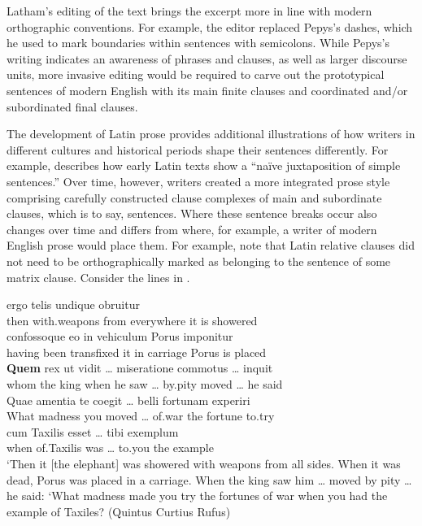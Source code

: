 \noindent Latham's \citep[34]{Pepys1978} editing of the text brings the excerpt more in line with modern orthographic conventions. For example, the editor replaced Pepys’s dashes, which he used to mark boundaries within sentences with semicolons. While Pepys’s writing indicates an awareness of phrases and clauses, as well as larger discourse units, more invasive editing would be required to carve out the prototypical sentences of modern English with its main finite clauses and coordinated and/or subordinated final clauses.

The development of Latin prose provides additional illustrations of how writers in different cultures and historical periods shape their sentences differently. For example, \citet[119]{Palmer1954} describes how early Latin texts show a “naïve juxtaposition of simple sentences.” Over time, however, writers created a more integrated prose style comprising carefully constructed clause complexes of main and subordinate clauses, which is to say, sentences. Where these sentence breaks occur also changes over time and differs from where, for example, a writer of modern English prose would place them. For example,  \citet[43]{MillerWeinert1998} note that Latin relative clauses did not need to be orthographically marked as belonging to the sentence of some matrix clause. Consider the lines in .

\ea%
    \label{ex:7:6}
\ea
\gll ergo  telis       undique       obruitur\\
then   with.weapons   {from everywhere}   {it is showered}\\

\ex
\gll confossoque         eo  in vehiculum   Porus  imponitur\\
{having been transfixed}  it  in carriage     Porus  {is placed}\\

\ex
\gll \textbf{Quem}   rex      ut     vidit   … miseratione   commotus   … inquit\\
whom   {the king}   when  {he saw}   … by.pity     moved     … {he said}\\

\ex
\gll Quae   amentia    te    coegit   … belli     fortunam  experiri\\
What  madness    you  moved   … of.war   {the fortune}  to.try\\

\ex
\gll  cum    Taxilis    esset   … tibi     exemplum\\
when  of.Taxilis  was   … to.you   {the example}\\
\glt ‘Then it [the elephant] was showered with weapons from all sides. When it was dead, Porus was placed in a carriage. When the king saw him … moved by pity … he said: ‘What madness made you try the fortunes of war when you had the example of Taxiles? (Quintus Curtius Rufus)
    \z
\z

